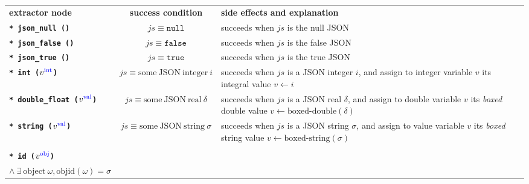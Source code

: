 \begin{table}%
  \begin{relsize}{-1.3}
  \begin{center}
    \begin{tabular}{lcp{6.3cm}}
      \textbf{extractor node} & \hspace*{1cm} \textbf{success condition} \hspace*{1cm}  & \textbf{side effects and explanation} \\
      \texttt{\textbf{* json\_null ()}} &
      $\mathit{js} \equiv \mathtt{null}$ &
      succeeds when $\mathit{js}$ is the null JSON \\
      \texttt{\textbf{* json\_false ()}} &
      $\mathit{js} \equiv \mathtt{false}$ &
      succeeds when $\mathit{js}$ is the false JSON \\
      \texttt{\textbf{* json\_true ()}} &
      $\mathit{js} \equiv \mathtt{true}$ &
      succeeds when $\mathit{js}$ is the true JSON \\
      \texttt{\textbf{* int ($v^{\mathrm{\textcolor{blue}{int}}}$)}} &
      $\mathit{js} \equiv \mathrm{some ~ JSON ~ integer}~ i$ &
      succeeds when $\mathit{js}$ is a JSON integer $i$, and assign to integer
      variable $v$ its integral value $v \leftarrow i$\\
      \texttt{\textbf{* double\_float ($v^{\mathrm{\textcolor{blue}{val}}}$)}} &
      $\mathit{js} \equiv \mathrm{some ~ JSON ~ real}~ \delta$ &
      succeeds when $\mathit{js}$ is a JSON real $\delta$, and assign to double
      variable $v$ its \emph{boxed} double value $v \leftarrow
      \mathrm{\textrm{boxed-double}} (\delta)$\\
      \texttt{\textbf{* string ($v^{\mathrm{\textcolor{blue}{val}}}$)}} &
      $\mathit{js} \equiv \mathrm{some ~ JSON ~ string}~ \sigma$ &
      succeeds when $\mathit{js}$ is a JSON string $\sigma$, and assign to
      value variable $v$ its \emph{boxed} string value $v \leftarrow
      \mathrm{\textrm{boxed-string}} (\sigma)$ \\
            \rule{0pt}{1ex} \\
      \texttt{\textbf{* id ($v^{\mathrm{\textcolor{blue}{obj}}}$)}} &
      \begin{minipage}[t]{4cm}
        $\mathit{js} \equiv \mathrm{some ~ JSON ~ string}~ \sigma$\\
        \hspace*{0.5em} $ \wedge ~ \exists ~ \mathrm{object} ~ \omega, \mathrm{objid}(\omega) = \sigma$ 

\end{minipage}
\end{tabular}
\end{center}
\end{relsize}
\end{table}
